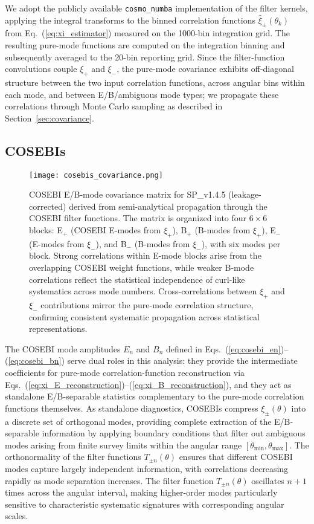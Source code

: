 \documentclass{aa}
\begin{document}
We adopt the publicly available \texttt{cosmo\_numba} implementation of the \citet{schneider.etal22} filter kernels, applying the integral transforms to the binned correlation functions $\hat{\xi}_\pm(\theta_k)$ from Eq.~(\ref{eq:xi_estimator}) measured on the 1000-bin integration grid. The resulting pure-mode functions are computed on the integration binning and subsequently averaged to the 20-bin reporting grid. Since the filter-function convolutions couple $\xi_+$ and $\xi_-$, the pure-mode covariance exhibits off-diagonal structure between the two input correlation functions, across angular bins within each mode, and between E/B/ambiguous mode types; we propagate these correlations through Monte Carlo sampling as described in Section~\ref{sec:covariance}.

\subsection{COSEBIs}

\begin{figure}[htb]
\centering
\texttt{[image: cosebis\_covariance.png]}
\caption{COSEBI E/B-mode covariance matrix for SP\_v1.4.5 (leakage-corrected) derived from semi-analytical propagation through the COSEBI filter functions. The matrix is organized into four $6 \times 6$ blocks: E$_+$ (COSEBI E-modes from $\xi_+$), B$_+$ (B-modes from $\xi_+$), E$_-$ (E-modes from $\xi_-$), and B$_-$ (B-modes from $\xi_-$), with six modes per block. Strong correlations within E-mode blocks arise from the overlapping COSEBI weight functions, while weaker B-mode correlations reflect the statistical independence of curl-like systematics across mode numbers. Cross-correlations between $\xi_+$ and $\xi_-$ contributions mirror the pure-mode correlation structure, confirming consistent systematic propagation across statistical representations.}
\label{fig:cosebis_covariance}
\end{figure}


The COSEBI mode amplitudes $E_n$ and $B_n$ defined in Eqs.~(\ref{eq:cosebi_en})--(\ref{eq:cosebi_bn}) serve dual roles in this analysis: they provide the intermediate coefficients for pure-mode correlation-function reconstruction via Eqs.~(\ref{eq:xi_E_reconstruction})--(\ref{eq:xi_B_reconstruction}), and they act as standalone E/B-separable statistics complementary to the pure-mode correlation functions themselves. As standalone diagnostics, COSEBIs compress $\xi_\pm(\theta)$ into a discrete set of orthogonal modes, providing complete extraction of the E/B-separable information by applying boundary conditions that filter out ambiguous modes arising from finite survey limits within the angular range $[\theta_{\mathrm{min}}, \theta_{\mathrm{max}}]$. The orthonormality of the filter functions $T_{\pm n}(\theta)$ ensures that different COSEBI modes capture largely independent information, with correlations decreasing rapidly as mode separation increases. The filter function $T_{\pm n}(\theta)$ oscillates $n+1$ times across the angular interval, making higher-order modes particularly sensitive to characteristic systematic signatures with corresponding angular scales.
\end{document}
